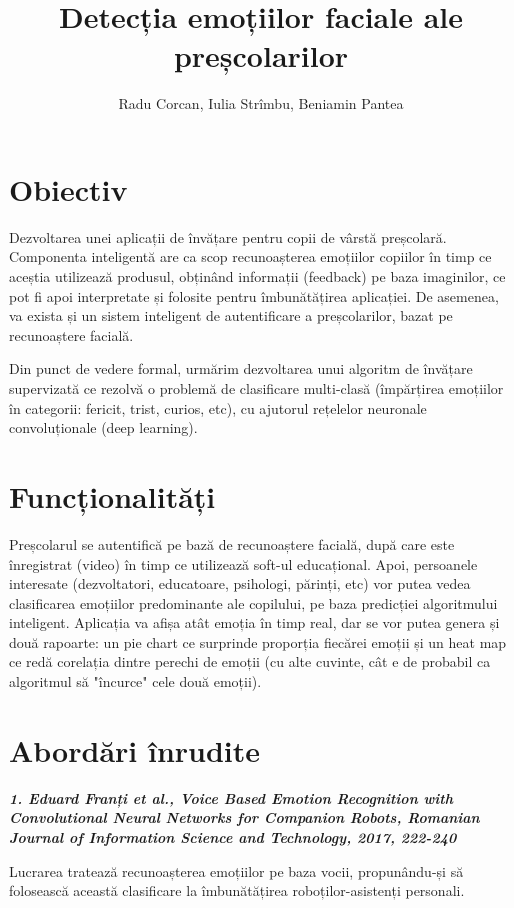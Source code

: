 \documentclass{article}
\begin{document}
\title{Detecția emoțiilor faciale ale preșcolarilor}
\author{Radu Corcan, Iulia Strîmbu, Beniamin Pantea}
\date{}
\maketitle

\section{Obiectiv}
Dezvoltarea unei aplicații de învățare pentru copii de vârstă preșcolară. Componenta inteligentă are ca scop recunoașterea emoțiilor copiilor în timp ce aceștia utilizează produsul, obținând informații (feedback) pe baza imaginilor, ce pot fi apoi interpretate și folosite pentru îmbunătățirea aplicației. De asemenea, va exista și un sistem inteligent de autentificare a preșcolarilor, bazat pe recunoaștere facială. 

Din punct de vedere formal, urmărim dezvoltarea unui algoritm de învățare supervizată ce rezolvă o problemă de clasificare multi-clasă (împărțirea emoțiilor în categorii: fericit, trist, curios, etc), cu ajutorul rețelelor neuronale convoluționale (deep learning).

\section{Funcționalități}
Preșcolarul se autentifică pe bază de recunoaștere facială, după care este înregistrat (video) în timp ce utilizează soft-ul educațional. Apoi, persoanele interesate (dezvoltatori, educatoare, psihologi, părinți, etc) vor putea vedea clasificarea emoțiilor predominante ale copilului, pe baza predicției algoritmului inteligent. Aplicația va afișa atât emoția în timp real, dar se vor putea genera și două rapoarte: un pie chart ce surprinde proporția fiecărei emoții și un heat map ce redă corelația dintre perechi de emoții (cu alte cuvinte, cât e de probabil ca algoritmul să "încurce" cele două emoții).

\section{Abordări înrudite}
\textit{\textbf{1. Eduard Franți et al., Voice Based Emotion Recognition with Convolutional Neural Networks for Companion Robots, Romanian Journal of Information Science and Technology, 2017, 222-240}}

Lucrarea tratează recunoașterea emoțiilor pe baza vocii, propunându-și să folosească această clasificare la îmbunătățirea roboților-asistenți personali.
\end{document}
